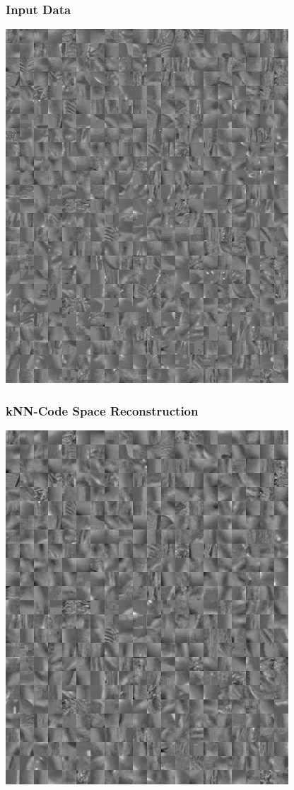 \documentclass{beamer}
\begin{document}
\begin{frame}
\frametitle{Input Data} 
  \begin{center}
             \includegraphics[scale=0.5]{./figures/input.png} 
    \end{center}
\end{frame} 

\begin{frame}
\frametitle{kNN-Code Space Reconstruction} 
  \begin{center}
             \includegraphics[scale=0.5]{./figures/znn.png} 
    \end{center}
\end{frame} 
\end{document}
